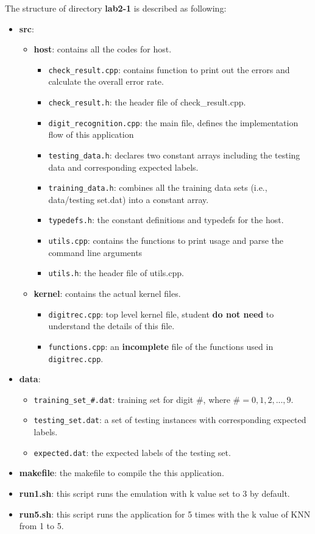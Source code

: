 \documentclass[paper=letter, fontsize=10pt]{scrartcl} %
\numberwithin{equation}{section} %
\numberwithin{figure}{section} %
\numberwithin{table}{section} %
\begin{document}
The structure of directory \textbf{lab2-1} is described as following:
\begin{itemize}
  \item \textbf{src}: 
   	\begin{itemize}
	 	\item \textbf{host}: contains all the codes for host.
		 	\begin{itemize}
	 			\item \texttt{check\_result.cpp}: contains function to print out the errors and calculate the overall error rate.
				\item \texttt{check\_result.h}: the header file of check\_result.cpp.
	 			\item \texttt{digit\_recognition.cpp}: the main file, defines the implementation flow of this application
				\item \texttt{testing\_data.h}: declares two constant arrays including the testing data and corresponding expected labels. 
				\item \texttt{training\_data.h}: combines all the training data sets (i.e., data/testing set.dat) into a constant array. 
				\item \texttt{typedefs.h}: the constant definitions and typedefs for the host. 
				\item \texttt{utils.cpp}: contains the functions to print usage and parse the command line arguments
				\item \texttt{utils.h}: the header file of utils.cpp.
			\end{itemize}
		\item \textbf{kernel}: contains the actual kernel files.
		 	\begin{itemize}
	 			\item \texttt{digitrec.cpp}: top level kernel file, student \textbf{do not need} to understand the details of this file.
				\item \texttt{functions.cpp}: an \textbf{ incomplete} file of the functions used in \texttt{digitrec.cpp}.
			\end{itemize}
	\end{itemize}
  \item \textbf{data}:
  	\begin{itemize}
	 	\item \texttt{training\_set\_\#.dat}: training set for digit $\#$, where $\#=0,1,2,...,9$.
		\item \texttt{testing\_set.dat}: a set of testing instances with corresponding expected labels.
		\item \texttt{expected.dat}: the expected labels of the testing set.
	\end{itemize}
  \item \textbf{makefile}: the makefile to compile the this application.
  \item \textbf{run1.sh}: this script runs the emulation with k value set to 3 by default.
  \item \textbf{run5.sh}: this script runs the application for 5 times with the k value of KNN from 1 to 5.
\end{itemize}
\end{document}
